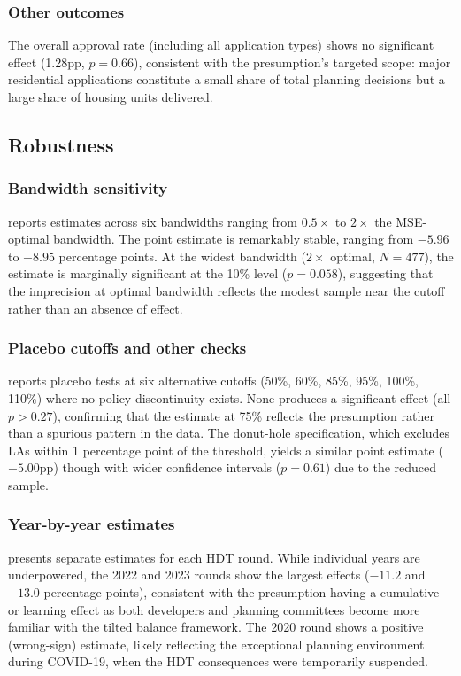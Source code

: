 \documentclass[12pt]{article}
\begin{document}
\subsubsection*{Other outcomes} The overall approval rate (including all application types) shows no significant effect (1.28pp, $p = 0.66$), consistent with the presumption's targeted scope: major residential applications constitute a small share of total planning decisions but a large share of housing units delivered.



\subsection{Robustness}

\subsubsection*{Bandwidth sensitivity}  reports estimates across six bandwidths ranging from $0.5\times$ to $2\times$ the MSE-optimal bandwidth. The point estimate is remarkably stable, ranging from $-5.96$ to $-8.95$ percentage points. At the widest bandwidth ($2\times$ optimal, $N = 477$), the estimate is marginally significant at the 10\% level ($p = 0.058$), suggesting that the imprecision at optimal bandwidth reflects the modest sample near the cutoff rather than an absence of effect.



\subsubsection*{Placebo cutoffs and other checks}  reports placebo tests at six alternative cutoffs (50\%, 60\%, 85\%, 95\%, 100\%, 110\%) where no policy discontinuity exists. None produces a significant effect (all $p > 0.27$), confirming that the estimate at 75\% reflects the presumption rather than a spurious pattern in the data. The donut-hole specification, which excludes LAs within 1 percentage point of the threshold, yields a similar point estimate ($-5.00$pp) though with wider confidence intervals ($p = 0.61$) due to the reduced sample.



\subsubsection*{Year-by-year estimates}  presents separate estimates for each HDT round. While individual years are underpowered, the 2022 and 2023 rounds show the largest effects ($-11.2$ and $-13.0$ percentage points), consistent with the presumption having a cumulative or learning effect as both developers and planning committees become more familiar with the tilted balance framework. The 2020 round shows a positive (wrong-sign) estimate, likely reflecting the exceptional planning environment during COVID-19, when the HDT consequences were temporarily suspended.
\end{document}
